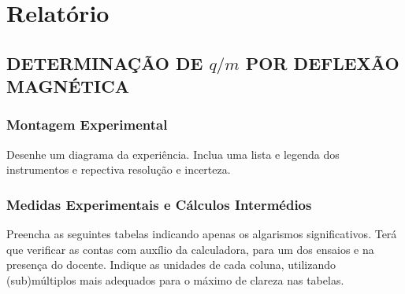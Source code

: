\documentclass[a4paper,12pt]{article}  %
\begin{document}
\section{\sf Relatório}
\subsection{\sf DETERMINAÇÃO DE $q/m$ POR  DEFLEXÃO MAGNÉTICA}
\subsubsection{\sf Montagem Experimental}
Desenhe um diagrama da experiência. Inclua uma lista e legenda dos instrumentos e repectiva resolução e incerteza.
\begin{center}
\framebox[18cm]{\rule{0pt}{12cm}}
\end{center}





\subsubsection{\sf Medidas Experimentais e Cálculos Intermédios } \label{sec:dados}
Preencha as seguintes tabelas indicando apenas os algarismos significativos. Terá que verificar as contas com auxílio da calculadora, para um dos ensaios e na presença do docente. Indique as unidades de cada coluna, utilizando (sub)múltiplos mais adequados para o máximo de clareza nas tabelas.
\newpage
\end{document}
